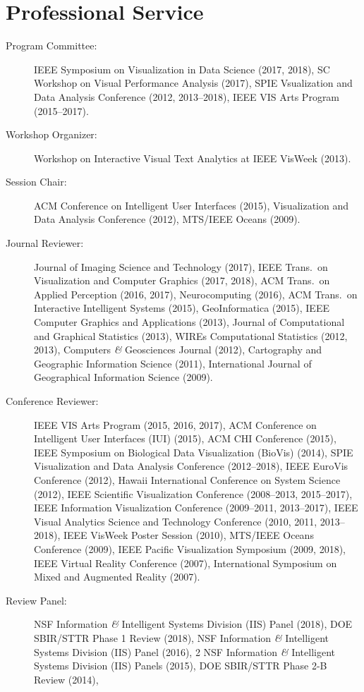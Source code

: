 \documentclass[11pt, letterpaper]{article}
\newcommand{\amper}{{\fontspec[Scale=.95]{Hoefler Text}\selectfont\itshape\&}}
\begin{document}
\section*{Professional Service}
\begin{sloppypar}
\begin{description}
  \item[Program Committee:] IEEE Symposium on Visualization in Data Science (2017, 2018), SC Workshop on Visual Performance Analysis (2017), SPIE Vsualization and Data Analysis Conference (2012, 2013--2018), IEEE VIS Arts Program (2015--2017).
  \item[Workshop Organizer:] Workshop on Interactive Visual Text Analytics at IEEE VisWeek (2013).
  \item[Session Chair:]ACM Conference on Intelligent User Interfaces (2015), Visualization and
  Data Analysis Conference (2012), MTS/IEEE Oceans (2009).
  \item[Journal Reviewer:] Journal of Imaging Science and Technology (2017), IEEE Trans.\ on Visualization and Computer Graphics (2017, 2018), ACM Trans.\ on Applied Perception (2016, 2017), Neurocomputing (2016), ACM Trans.\ on Interactive Intelligent Systems (2015), GeoInformatica (2015), IEEE Computer Graphics and Applications (2013),
  Journal of Computational and Graphical Statistics (2013),
  WIREs Computational Statistics (2012, 2013),
  Computers \amper{} Geosciences Journal (2012),
  Cartography and Geographic Information Science (2011),
  International Journal of Geographical Information Science (2009).
  \item[Conference Reviewer:] IEEE VIS Arts Program (2015, 2016, 2017),
  ACM Conference on Intelligent User Interfaces
  (IUI) (2015), ACM CHI Conference (2015),
  IEEE Symposium on Biological Data Visualization (BioVis) (2014),
  SPIE Visualization and Data Analysis Conference (2012--2018),
  IEEE EuroVis Conference (2012),
  Hawaii International Conference on System
  Science (2012), IEEE Scientific Visualization Conference (2008--2013, 2015--2017), IEEE Information Visualization Conference (2009--2011, 2013--2017),
  IEEE Visual Analytics Science and Technology Conference (2010, 2011, 2013--2018), IEEE VisWeek Poster Session (2010),
  MTS/IEEE Oceans Conference (2009), IEEE Pacific Visualization Symposium
  (2009, 2018), IEEE Virtual Reality Conference (2007), International Symposium
  on Mixed and Augmented Reality (2007).
  \item[Review Panel:] NSF Information \amper{} Intelligent Systems Division (IIS) Panel (2018), DOE SBIR/STTR Phase 1 Review (2018), NSF Information \amper{} Intelligent Systems Division (IIS) Panel (2016), 2 NSF Information \amper{} Intelligent Systems Division (IIS) Panels (2015), DOE SBIR/STTR Phase 2-B Review (2014),

\end{description}
\end{sloppypar}
\end{document}
